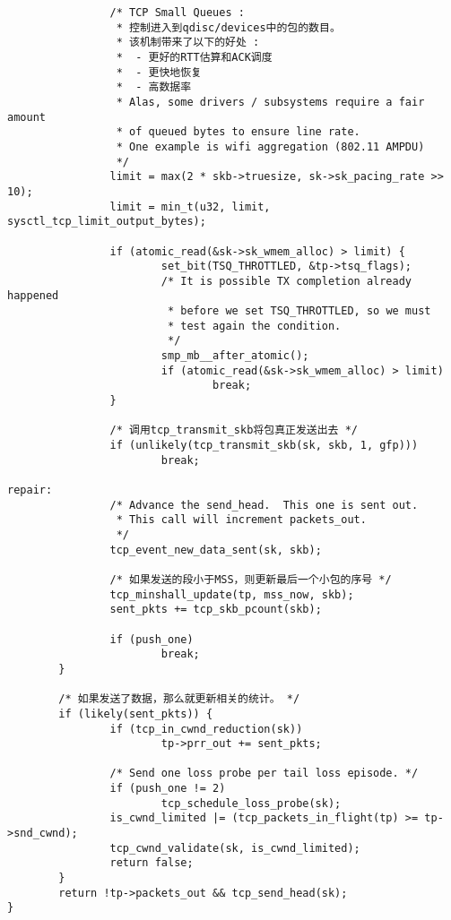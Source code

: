 \begin{verbatim}
                /* TCP Small Queues :
                 * 控制进入到qdisc/devices中的包的数目。
                 * 该机制带来了以下的好处 :
                 *  - 更好的RTT估算和ACK调度
                 *  - 更快地恢复
                 *  - 高数据率
                 * Alas, some drivers / subsystems require a fair amount
                 * of queued bytes to ensure line rate.
                 * One example is wifi aggregation (802.11 AMPDU)
                 */
                limit = max(2 * skb->truesize, sk->sk_pacing_rate >> 10);
                limit = min_t(u32, limit, sysctl_tcp_limit_output_bytes);

                if (atomic_read(&sk->sk_wmem_alloc) > limit) {
                        set_bit(TSQ_THROTTLED, &tp->tsq_flags);
                        /* It is possible TX completion already happened
                         * before we set TSQ_THROTTLED, so we must
                         * test again the condition.
                         */
                        smp_mb__after_atomic();
                        if (atomic_read(&sk->sk_wmem_alloc) > limit)
                                break;
                }

                /* 调用tcp_transmit_skb将包真正发送出去 */
                if (unlikely(tcp_transmit_skb(sk, skb, 1, gfp)))
                        break;

repair:
                /* Advance the send_head.  This one is sent out.
                 * This call will increment packets_out.
                 */
                tcp_event_new_data_sent(sk, skb);

                /* 如果发送的段小于MSS，则更新最后一个小包的序号 */
                tcp_minshall_update(tp, mss_now, skb);
                sent_pkts += tcp_skb_pcount(skb);

                if (push_one)
                        break;
        }

        /* 如果发送了数据，那么就更新相关的统计。 */
        if (likely(sent_pkts)) {
                if (tcp_in_cwnd_reduction(sk))
                        tp->prr_out += sent_pkts;

                /* Send one loss probe per tail loss episode. */
                if (push_one != 2)
                        tcp_schedule_loss_probe(sk);
                is_cwnd_limited |= (tcp_packets_in_flight(tp) >= tp->snd_cwnd);
                tcp_cwnd_validate(sk, is_cwnd_limited);
                return false;
        }
        return !tp->packets_out && tcp_send_head(sk);
}
\end{verbatim}


